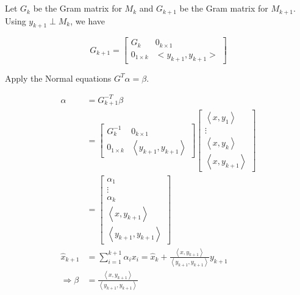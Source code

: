 \documentclass{article}
\theoremstyle{definition} %
\begin{document}
\section{}

\subsection{}\label{sec-3-1}

Let $G_k$ be the Gram matrix for $M_k$ and $G_{k+1}$ be the Gram matrix for $M_{k+1}$. Using $y_{k+1}\perp M_k$, we have

$$
G_{k+1} = 
\begin{bmatrix}
    G_k & 0_{k\times 1}\\
    0_{1\times k} & <y_{k+1}, y_{k+1}>
\end{bmatrix}
$$

Apply the Normal equations $G^T\alpha = \beta$.

\begin{align*}
    \alpha &= G_{k+1}^{-T} \beta\\
    &=\left[\begin{array}{cc}
    G_k^{-1} & 0_{k \times 1} \\
    0_{1\times k} & \left< y_{k+1}, y_{k+1}\right>
    \end{array}\right]
    \left[\begin{array}{c}
    \left\langle x, y_1\right\rangle \\
    \vdots \\
    \left\langle x, y_k\right\rangle \\
    \left\langle x, y_{k+1}\right\rangle
    \end{array}\right]\\
    &=\left[\begin{array}{c}
    \alpha_1 \\
    \vdots \\
    \alpha_k \\
    \left\langle x, y_{k+1}\right\rangle \\
    \hline\left\langle y_{k+1}, y_{k+1}\right\rangle
    \end{array}\right]\\
    \hat{x}_{k+1}&=\sum_{i=1}^{k+1} \alpha_i x_i=\hat{x}_k+\frac{\left\langle x, y_{k+1}\right\rangle}{\left\langle y_{k+1}, y_{k+1}\right\rangle} y_{k+1}\\
    \Rightarrow \beta &= \frac{\left\langle x, y_{k+1}\right\rangle}{\left\langle y_{k+1}, y_{k+1}\right\rangle}
\end{align*}
\end{document}
